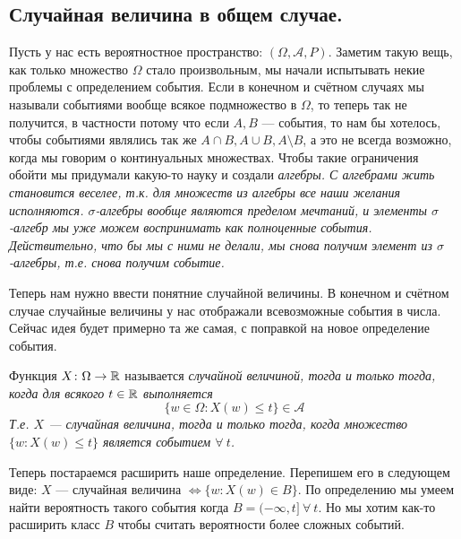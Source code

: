\subsection{Случайная величина в общем случае.}
Пусть у нас есть вероятностное пространство: $(\Omega, \mathcal{A}, P)$. Заметим такую вещь, как только множество
$\Omega$ стало произвольным, мы начали испытывать некие проблемы с определением события. Если в конечном и счётном
случаях мы называли событиями вообще всякое подмножество в $\Omega$, то теперь так не получится, в частности потому что
если $A, B$ --- события, то нам бы хотелось, чтобы событиями являлись так же $A \cap B, A \cup B, A \setminus B$, а это
не всегда возможно, когда мы говорим о континуальных множествах. Чтобы такие ограничения обойти мы придумали какую-то науку
и создали \it{алгебры}. С алгебрами жить становится веселее, т.к. для множеств из алгебры все наши желания исполняются.
\it{$\sigma$-алгебры} вообще являются пределом мечтаний, и элементы $\sigma$-алгебр мы уже можем воспринимать как полноценные
события. Действительно, что бы мы с ними не делали, мы снова получим элемент из $\sigma$-алгебры, т.е. снова получим событие.

Теперь нам нужно ввести понятние случайной величины. В конечном и счётном случае случайные величины у нас отображали
всевозможные события в числа. Сейчас идея будет примерно та же самая, с поправкой на новое определение события.
\begin{definition}
    Функция $X \colon \Omega \to \mathbb{R}$ называется \it{случайной величиной}, тогда и только тогда, когда
    для всякого $t \in \mathbb{R}$ выполняется
    \[
        \{w \in \Omega \colon X(w) \leq t\} \in \mathcal{A}
    \]
    Т.е. $X$ --- случайная величина, тогда и только тогда, когда множество $\{w \colon X(w) \leq t\}$ является событием $\forall ~ t$.
\end{definition}
\begin{comment}
    Заметим следующее:
    \[
        \{w \in \Omega \colon X(w) \leq t\} = \{w \in \Omega \colon X(w) \in (-\infty; t]\}
    \]
    Т.е. то множество, которое мы хотим считать событием при любом $t$ состоит из исходов, которые под действием случайной
    величины $X$ попадают в множество $(-\infty; t]$. Т.е. это множество по определению является полным прообразом множества
    $\{X(w) \colon X(w) \in (-\infty; t]\} = X((-\infty; t])$, и мы соответственно его будет обозначать как $X^{-1}((-\infty; t])$.
\end{comment}
Теперь постараемся расширить наше определение. Перепишем его в следующем виде: $X$ --- случайная величина $\iff
\{w \colon X(w) \in B\}$. По определению мы умеем найти вероятность такого события когда $B = (-\infty, t] ~ \forall ~ t$.
Но мы хотим как-то расширить класс $B$ чтобы считать вероятности более сложных событий.

